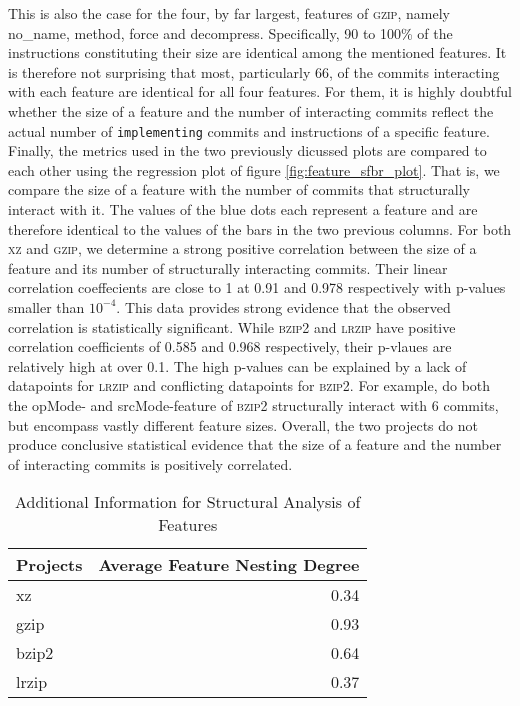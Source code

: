 This is also the case for the four, by far largest, features of \textsc{gzip}, namely \textsf{no\_name, method, force} and \textsf{decompress}.
Specifically, 90 to 100\% of the instructions constituting their size are identical among the mentioned features.
It is therefore not surprising that most, particularly 66, of the commits interacting with each feature are identical for all four features.
For them, it is highly doubtful whether the size of a feature and the number of interacting commits reflect the actual number of \texttt{implementing} commits and instructions of a specific feature. \\
Finally, the metrics used in the two previously dicussed plots are compared to each other using the regression plot of figure \ref{fig:feature_sfbr_plot}.
That is, we compare the size of a feature with the number of commits that structurally interact with it.
The values of the blue dots each represent a feature and are therefore identical to the values of the bars in the two previous columns.
For both \textsc{xz} and \textsc{gzip}, we determine a strong positive correlation between the size of a feature and its number of structurally interacting commits.
Their linear correlation coeffecients are close to 1 at 0.91 and 0.978 respectively with p-values smaller than $10^{-4}$.
This data provides strong evidence that the observed correlation is statistically significant.
While \textsc{bzip2} and \textsc{lrzip} have positive correlation coefficients of 0.585 and 0.968 respectively, their p-vlaues are relatively high at over 0.1.
The high p-values can be explained by a lack of datapoints for \textsc{lrzip} and conflicting datapoints for \textsc{bzip2}.
For example, do both the \textsf{opMode}- and \textsf{srcMode}-feature of \textsc{bzip2} structurally interact with 6 commits, but encompass vastly different feature sizes.
Overall, the two projects do not produce conclusive statistical evidence that the size of a feature and the number of interacting commits is positively correlated.

\begin{table}[t]
\caption{Additional Information for Structural Analysis of Features}
\label{tab:feature_sfbr_table}
\centering
\begin{tabular}{l r}
\toprule
\textbf{Projects} & \textbf{Average Feature Nesting Degree} \\ 
\midrule
  xz    & 0.34 \\
  gzip  & 0.93 \\
  bzip2 & 0.64 \\
  lrzip & 0.37 \\
\bottomrule
\end{tabular}
\end{table}

